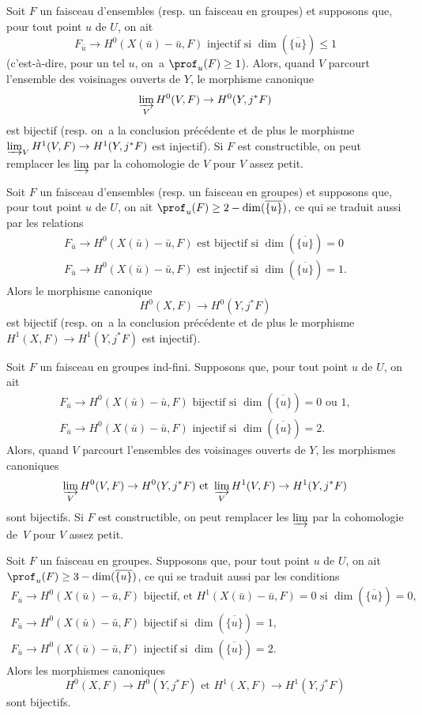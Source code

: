 \begin{enumeratea}
\item
Soit $F$ un faisceau d'ensembles (resp. un faisceau en groupes) et supposons que, pour tout point $u$ de $U$, on ait
$$F_{\bar{u}} \to H^0(X(\bar{u})-\bar{u}, F)\text{ injectif si } \dim(\overline{\{u\}}) \leq 1$$
(c'est-\`a-dire, pour un tel $u$, on~a $\prof_u(F) \geq 1$). Alors, quand $V$ parcourt l'ensemble des voisinages ouverts de $Y$, le morphisme canonique
$$
\varinjlim_V H^0(V, F) \to H^0(Y, j^*F)
$$
est bijectif (resp. on~a la conclusion pr\'ec\'edente et de plus le morphisme $\varinjlim_V H^1(V, F) \to H^1(Y, j^* F)$ est injectif). Si $F$ est constructible, on peut remplacer les $\varinjlim$ par la cohomologie de $V$ pour $V$ \og assez petit\fg.
\item
Soit $F$ un faisceau d'ensembles (resp. un faisceau en groupes) et supposons que, pour tout point $u$ de $U$, on ait $\prof_u(F) \geq 2 -\dim(\overline{\{u\}})$, ce qui se traduit aussi par les relations
\begin{gather*}
F_{\bar{u}}\to H^0(X(\bar{u})-\bar{u}, F)\text{ est bijectif si } \dim(\overline{\{u\}})=0\\
F_{\bar{u}}\to H^0(X(\bar{u})-\bar{u}, F)\text{ est injectif si } \dim(\overline{\{u\}})=1.
\end{gather*}
Alors le morphisme canonique
$$H^0(X, F) \to H^0(Y, j^*F)$$
est bijectif (resp. on~a la conclusion pr\'ec\'edente et de plus le morphisme $H^1(X, F) \to H^1(Y, j^*F)$ est injectif).
\item
Soit $F$ un faisceau en groupes ind-fini. Supposons que, pour tout point $u$ de $U$, on ait
\begin{gather*}
F_{\bar{u}}\to H^0(X(\bar{u})-\bar{u}, F)\text{ bijectif si } \dim(\overline{\{u\}})=0\text{ ou }1,\\
F_{\bar{u}}\to H^0(X(\bar{u})-\bar{u}, F)\text{ injectif si } \dim(\overline{\{u\}})=2.
\end{gather*}
Alors, quand $V$ parcourt l'ensembles des voisinages ouverts de $Y$, les morphismes canoniques
$$
\varinjlim_V H^0(V, F) \to H^0(Y, j^*F) \text{ et } \varinjlim_V H^1(V, F) \to H^1(Y, j^*F)
$$
sont bijectifs. Si $F$ est constructible, on peut remplacer les $\varinjlim$ par la cohomologie de~$V$ pour $V$ assez petit.
\item
Soit $F$ un faisceau en groupes. Supposons que, pour tout point $u$ de $U$, on ait $\prof_u(F) \geq 3-\dim(\overline{\{u\}})$, ce qui se traduit aussi par les conditions
\begin{gather*}
F_{\bar{u}}\to H^0(X(\bar{u})-\bar{u}, F)\text{ bijectif, et } H^1(X(\bar{u})-\bar{u}, F)=0 \text{ si } \dim(\overline{\{u\}})=0,\\
F_{\bar{u}}\to H^0(X(\bar{u})-\bar{u}, F)\text{ bijectif si } \dim(\overline{\{u\}})=1,\\
F_{\bar{u}}\to H^0(X(\bar{u})-\bar{u}, F)\text{ injectif si } \dim(\overline{\{u\}})=2.
\end{gather*}
Alors les morphismes canoniques
$$H^0(X, F) \to H^0(Y, j^*F)\text{ et } H^1(X, F) \to H^1(Y, j^*F)$$
sont bijectifs.
\end{enumeratea}

